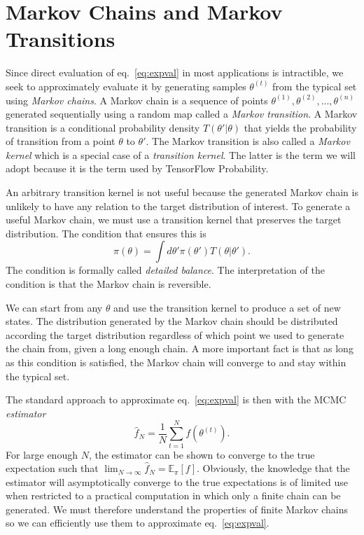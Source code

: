 \section{Markov Chains and Markov Transitions}
Since direct evaluation of eq.~\eqref{eq:expval} in most applications is intractible, we seek to approximately evaluate it
by generating samples $\theta^{(t)}$ from the typical set using \textit{Markov chains}. A Markov chain is a sequence of points $\theta^{(1)}, \theta^{(2)}, ..., \theta^{(n)}$ generated sequentially
using a random map called a \textit{Markov transition}. A Markov transition is a conditional probability density
$T(\theta'|\theta)$ that yields the probability of transition from a point $\theta$ to $\theta'$. The Markov transition is also called
a \textit{Markov kernel} which is a special case of a \textit{transition kernel}. The latter is the term we will adopt because it
is the term used by TensorFlow Probability.

An arbitrary transition kernel is not useful because the generated Markov chain is unlikely to have any relation to the target distribution
of interest. To generate a useful Markov chain, we must use a transition kernel that preserves the target distribution. 
The condition that ensures this is
\begin{equation}\label{eq:detailed_balance}
    \pi(\theta) = \int d\theta' \pi(\theta')T(\theta|\theta').
\end{equation}
The condition is formally called \textit{detailed balance}. The interpretation of the condition is that the Markov chain is reversible.

We can start from any $\theta$ and use the transition kernel to produce a set of new states. The distribution generated by the Markov chain
should be distributed according the target distribution regardless of which point we used to generate the chain from, given a long enough chain. A more important
fact is that as long as this condition is satisfied, the Markov chain will converge to and stay within the typical set.

The standard approach to approximate eq.~\eqref{eq:expval} is then with the MCMC \textit{estimator}
\begin{equation}\label{eq:mcmc_estimator}
    \hat{f}_N = \frac{1}{N}\sum_{t=1}^N f(\theta^{(t)}).
\end{equation}
For large enough $N$, the estimator can be shown to converge to the true expectation such that $\lim_{N\to\infty} \hat{f}_N = \mathbb{E}_\pi[f]$.
Obviously, the knowledge that the estimator will asymptotically converge to the true expectations is of limited use
when restricted to a practical computation in which only a finite chain can be generated. 
We must therefore understand the properties of finite Markov chains so we can efficiently use them to approximate eq.~\eqref{eq:expval}.

